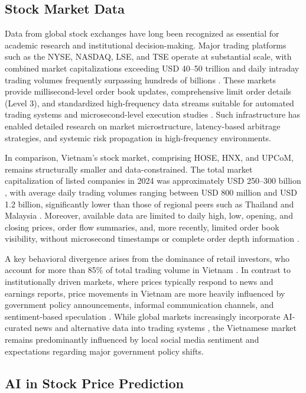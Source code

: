\documentclass{ieeeaccess}
\begin{document}
\subsection{Stock Market Data}
Data from global stock exchanges have long been recognized as essential for academic research and institutional decision-making. Major trading platforms such as the NYSE, NASDAQ, LSE, and TSE operate at substantial scale, with combined market capitalizations exceeding USD 40–50 trillion and daily intraday trading volumes frequently surpassing hundreds of billions \cite{WorldFederation2024}. These markets provide millisecond-level order book updates, comprehensive limit order details (Level 3), and standardized high-frequency data streams suitable for automated trading systems and microsecond-level execution studies \cite{Jones2019HFT}. Such infrastructure has enabled detailed research on market microstructure, latency-based arbitrage strategies, and systemic risk propagation in high-frequency environments.

In comparison, Vietnam's stock market, comprising HOSE, HNX, and UPCoM, remains structurally smaller and data-constrained. The total market capitalization of listed companies in 2024 was approximately USD 250–300 billion \cite{HOSE2024Report}, with average daily trading volumes ranging between USD 800 million and USD 1.2 billion, significantly lower than those of regional peers such as Thailand and Malaysia \cite{ADB2024}. Moreover, available data are limited to daily high, low, opening, and closing prices, order flow summaries, and, more recently, limited order book visibility, without microsecond timestamps or complete order depth information \cite{Nguyen2022Microstructure}. 

A key behavioral divergence arises from the dominance of retail investors, who account for more than 85\% of total trading volume in Vietnam \cite{SSI2024Retail}. In contrast to institutionally driven markets, where prices typically respond to news and earnings reports, price movements in Vietnam are more heavily influenced by government policy announcements, informal communication channels, and sentiment-based speculation \cite{StateBank2023}. While global markets increasingly incorporate AI-curated news and alternative data into trading systems \cite{BloombergAI2023}, the Vietnamese market remains predominantly influenced by local social media sentiment and expectations regarding major government policy shifts.


\subsection{AI in Stock Price Prediction}
\end{document}
